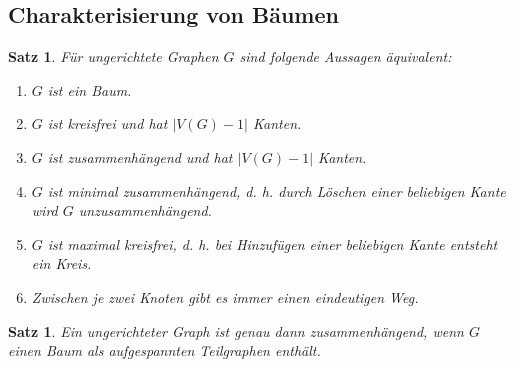 \documentclass[a4paper,12pt]{article}
\newtheorem{satz}[axiom]{Satz}
\theoremstyle{definition}
\begin{document}
	\subsection{Charakterisierung von Bäumen}
	\begin{satz}
		Für ungerichtete Graphen $G$ sind folgende Aussagen äquivalent:
		\begin{enumerate}[label=(\roman*)]
			\item $G$ ist ein Baum.
			\item $G$ ist kreisfrei und hat $\lvert V(G) - 1\rvert$ Kanten.
			\item $G$ ist zusammenhängend und hat $\lvert V(G) - 1\rvert$ Kanten.
			\item $G$ ist minimal zusammenhängend, d. h. durch Löschen einer beliebigen Kante wird $G$ unzusammenhängend.
			\item $G$ ist maximal kreisfrei, d. h. bei Hinzufügen einer beliebigen Kante entsteht ein Kreis.
			\item Zwischen je zwei Knoten gibt es immer einen eindeutigen Weg.
		\end{enumerate}
	\end{satz}
	\begin{satz}
		Ein ungerichteter Graph ist genau dann zusammenhängend, wenn $G$ einen Baum als aufgespannten Teilgraphen enthält.
	\end{satz}
\end{document}

